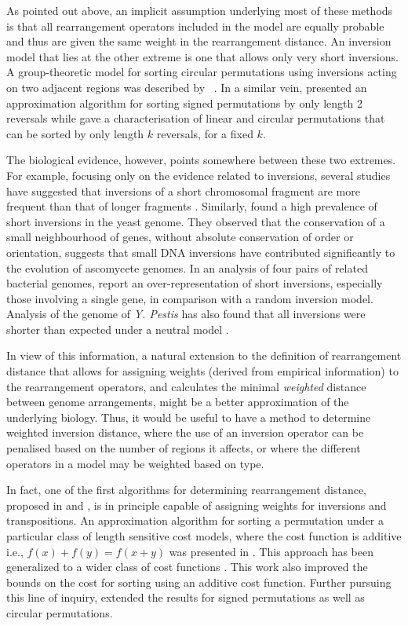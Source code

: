 \documentclass[12pt,a4paper]{amsart}
\numberwithin{equation}{section}
\begin{document}
As pointed out above, an implicit assumption underlying most of these methods is that all rearrangement operators included in the model are equally probable and thus are given the same weight in the rearrangement distance. 
An inversion model that lies at the other extreme is one that allows only very short inversions. 
A group-theoretic model for sorting circular permutations using inversions acting on two adjacent regions was described by ~\citet{egrinagy2013group}. In a similar vein, \citet{galvao2015sorting} presented an approximation algorithm for sorting signed permutations by only length 2 reversals while \citet{chen1996sorting} gave a characterisation of linear and circular permutations that can be sorted by only length $k$ reversals, for a fixed $k$. 

The biological evidence, however, points somewhere between these two extremes. For example, focusing only on the evidence related to inversions, several studies have suggested that inversions of a short chromosomal fragment are more frequent than that of longer fragments \citep{seoighe2000prevalence, lefebvre2003detection,Darling2008,eisen2000evidence}. Similarly, \citet{seoighe2000prevalence} found a high prevalence of short inversions in the yeast genome. They observed that the conservation of a small neighbourhood of genes, without absolute conservation of order or orientation, suggests that small DNA inversions have contributed significantly to the evolution of ascomycete genomes. In an analysis of four pairs of related bacterial genomes, \citet{lefebvre2003detection} report an over-representation of short inversions, especially those involving a single gene, in comparison with a random inversion model. Analysis of the genome of \emph{Y. Pestis} has also found that all inversions were shorter than expected under a neutral model \citep{Darling2008}.

In view of this information, a natural extension to the definition of rearrangement distance 
that allows for assigning weights (derived from empirical information) to the rearrangement operators, and calculates the minimal \emph{weighted} distance between genome arrangements, might be a better approximation of the underlying biology. 
Thus, it would be useful to have a method to determine weighted inversion distance, where the use of an inversion operator can be penalised based on the number of regions it affects, or where the different operators in a model may be weighted based on type. 

In fact, one of the first algorithms for determining rearrangement distance, proposed in \citet{sankoff1992edit} and \citet{sankoff1992gene}, is in principle capable of assigning weights for inversions and transpositions. An approximation algorithm for sorting a permutation under a particular class of length sensitive cost models, where the cost function is additive i.e., $f(x) + f(y) = f(x+y)$ was presented in \citet{pinter2002genomic}. This approach has been generalized  to a wider class of cost functions \citep{bender2008improved}. This work also improved the bounds on the cost for sorting using an additive cost function. Further pursuing this line of inquiry, \citet{swidan2004sorting} extended the results for signed permutations as well as circular permutations.
\end{document}
